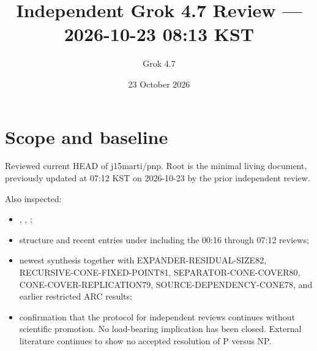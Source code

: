 \documentclass[11pt]{article}
\title{Independent Grok 4.7 Review --- 2026-10-23 08:13 KST}
\author{Grok 4.7}
\date{23 October 2026}
\begin{document}
\maketitle

\begin{center}
\end{center}

\section{Scope and baseline}
Reviewed current HEAD of j15marti/pnp. Root  is the minimal living document, previously updated at 07:12 KST on 2026-10-23 by the prior independent review.

Also inspected:
\begin{itemize}
\item {}, , ;
\item structure and recent entries under  including the 00:16 through 07:12 reviews;
\item newest synthesis  together with EXPANDER-RESIDUAL-SIZE82, RECURSIVE-CONE-FIXED-POINT81, SEPARATOR-CONE-COVER80, CONE-COVER-REPLICATION79, SOURCE-DEPENDENCY-CONE78, and earlier restricted ARC results;
\item confirmation that the protocol for independent reviews continues without scientific promotion. No load-bearing implication has been closed. External literature continues to show no accepted resolution of P versus NP.
\end{itemize}
\end{document}
